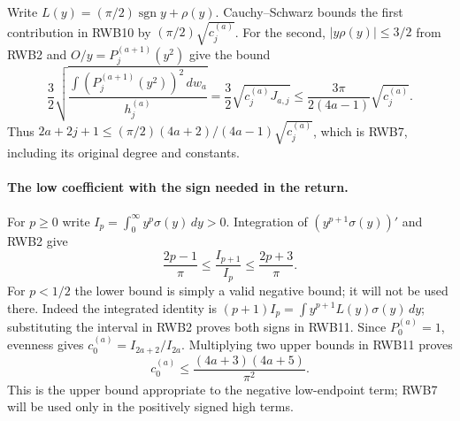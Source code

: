 \documentclass[11pt,a4paper]{article}
\begin{document}
Write $L(y)=(\pi/2)\operatorname{sgn}y+\rho(y)$.
Cauchy--Schwarz bounds the first contribution in RWB10 by
$(\pi/2)\sqrt{c_j^{(a)}}$. For the second, $|y\rho(y)|\le3/2$
from RWB2 and $O/y=P_j^{(a+1)}(y^2)$ give the bound
\[
 \frac32\sqrt{
 \frac{\int(P_j^{(a+1)}(y^2))^2\,dw_a}{h_j^{(a)}}}
 =\frac32\sqrt{c_j^{(a)}J_{a,j}}
 \le\frac{3\pi}{2(4a-1)}\sqrt{c_j^{(a)}}.
\]
Thus $2a+2j+1\le(\pi/2)(4a+2)/(4a-1)\sqrt{c_j^{(a)}}$,
which is RWB7, including its original degree and constants.

\paragraph{The low coefficient with the sign needed in the return.}
For $p\ge0$ write $I_p=\int_0^\infty y^p\sigma(y)\,dy>0$.
Integration of $(y^{p+1}\sigma(y))'$ and RWB2 give
\[
 \frac{2p-1}{\pi}\le\frac{I_{p+1}}{I_p}
 \le\frac{2p+3}{\pi}.
 \tag{RWB11}
\]
For $p<1/2$ the lower bound is simply a valid negative bound; it will
not be used there. Indeed the integrated identity is
$(p+1)I_p=\int y^{p+1}L(y)\sigma(y)\,dy$; substituting the interval
in RWB2 proves both signs in RWB11. Since $P_0^{(a)}=1$, evenness
gives $c_0^{(a)}=I_{2a+2}/I_{2a}$. Multiplying two upper bounds in
RWB11 proves
\[
 \boxed{\displaystyle c_0^{(a)}\le
 \frac{(4a+3)(4a+5)}{\pi^2}.}
 \tag{RWB12}
\]
This is the upper bound appropriate to the negative low-endpoint term;
RWB7 will be used only in the positively signed high terms.
\end{document}

